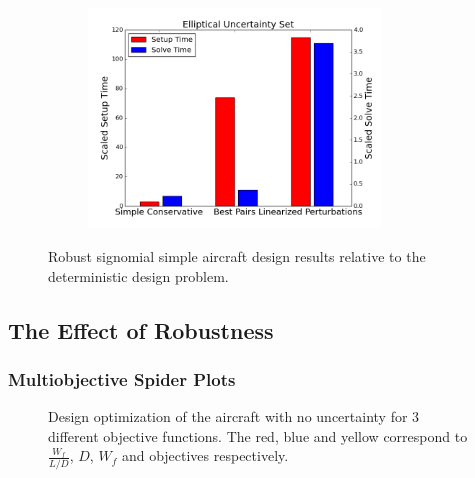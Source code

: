 \begin{figure}[ht]
\begin{subfigure}{0.499\textwidth}
    \end{subfigure}%
    ~ 
    \begin{subfigure}{0.49\textwidth}
        \centering
        \includegraphics[height=2.3in]{signomial_simple_flight/ell_times.png}
    \end{subfigure}
    \caption{Robust signomial simple aircraft design results relative to the deterministic design problem.}
    \label{compare_signomial}
\end{figure}

\subsection{The Effect of Robustness}

\subsubsection{Multiobjective Spider Plots}

\begin{figure}
\begin{center}
\end{center}
\caption[Deterministic Spider Plot]{Design optimization of the aircraft with no uncertainty for 3 different objective functions.
The red, blue and yellow correspond to $\frac{W_f}{L/D}$, $D$, $W_f$ and objectives respectively.}
\label{fig:spiderplotnoUncert}
\end{figure}

